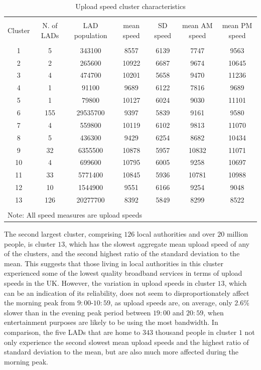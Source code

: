 \documentclass[Royal,times,sageh]{sagej}
\begin{document}
\begin{table}[!htbp] \centering 
  \caption{Upload speed cluster characteristics\label{up.cluster.descr}} 
  \label{} 
\footnotesize 
\begin{tabular}{@{\extracolsep{0pt}} ccccccc} 
\\[-1.8ex]\hline 
\hline \\[-1.8ex] 
Cluster & N. of LADs & LAD population & mean speed & SD speed & mean AM speed & mean PM speed \\ 
\hline \\[-1.8ex] 
1 & 5 & 343100 & 8557 & 6139 & 7747 & 9563 \\ 
2 & 2 & 265600 & 10922 & 6687 & 9674 & 10645 \\ 
3 & 4 & 474700 & 10201 & 5658 & 9470 & 11236 \\ 
4 & 1 & 91100 & 9689 & 6122 & 7816 & 9689 \\ 
5 & 1 & 79800 & 10127 & 6024 & 9030 & 11101 \\ 
6 & 155 & 29535700 & 9397 & 5839 & 9161 & 9580 \\ 
7 & 4 & 559800 & 10119 & 6102 & 9813 & 11070 \\ 
8 & 5 & 436300 & 9429 & 6254 & 8682 & 10434 \\ 
9 & 32 & 6355500 & 10878 & 5957 & 10832 & 11071 \\ 
10 & 4 & 699600 & 10795 & 6005 & 9258 & 10697 \\ 
11 & 33 & 5771400 & 10845 & 5936 & 10781 & 10988 \\ 
12 & 10 & 1544900 & 9551 & 6166 & 9254 & 9048 \\ 
13 & 126 & 20277700 & 8392 & 5849 & 8299 & 8522 \\ 
\hline \\[-1.8ex] 
\multicolumn{7}{l}{Note: All speed measures are upload speeds} \\ 
\end{tabular} 
\end{table}

The second largest cluster, comprising \(126\) local authorities and
over \(20\) million people, is cluster \(13\), which has the slowest
aggregate mean upload speed of any of the clusters, and the second
highest ratio of the standard deviation to the mean. This suggests that
those living in local authorities in this cluster experienced some of
the lowest quality broadband services in terms of upload speeds in the
UK. However, the variation in upload speeds in cluster \(13\), which can
be an indication of its reliability, does not seem to disproportionately
affect the morning peak from \(9:00\)-\(10:59\), as upload speeds are,
on average, only \(2.6\)\% slower than in the evening peak period
between \(19:00\) and \(20:59\), when entertainment purposes are likely
to be using the most bandwidth. In comparison, the five LADs that are
home to \(343\) thousand people in cluster \(1\) not only experience the
second slowest mean upload speeds and the highest ratio of standard
deviation to the mean, but are also much more affected during the
morning peak.
\end{document}

